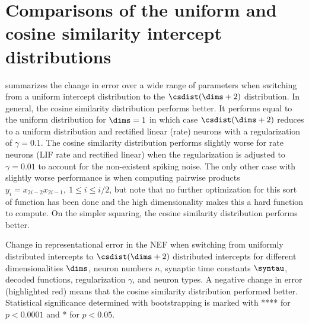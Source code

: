 \chapter{Comparisons of the uniform and cosine similarity intercept distributions}\label{apdx:hdrep}
 summarizes the change in error over a wide range of parameters when switching from a uniform intercept distribution to the $\csdist(\dims + 2)$ distribution.
In general, the cosine similarity distribution performs better.
It performs equal to the uniform distribution for $\dims = 1$ in which case $\csdist(\dims + 2)$ reduces to a uniform distribution and rectified linear (rate) neurons with a regularization of $\gamma = 0.1$.
The cosine similarity distribution performs slightly worse for rate neurons (LIF rate and rectified linear) when the regularization is adjusted to $\gamma = 0.01$ to account for the non-existent spiking noise.
The only other case with slightly worse performance is when computing pairwise products $y_i = x_{2i - 2} x_{2i - 1},\ 1 \leq i \leq i/2$, but note that no further optimization for this sort of function has been done and the high dimensionality makes this a hard function to compute.
On the simpler squaring, the cosine similarity distribution performs better.
\begin{table}
    \caption{Change in representational error in the NEF when switching from uniformly distributed intercepts to $\csdist(\dims + 2)$ distributed intercepts for different dimensionalities $\dims$, neuron numbers $n$, synaptic time constants $\syntau$, decoded functions, regularization $\gamma$, and neuron types.
A negative change in error (highlighted red) means that the cosine similarity distribution performed better.
Statistical significance determined with bootstrapping is marked with **** for $p < 0.0001$ and * for $p < 0.05$.}\label{tbl:csdist}
    \scriptsize
    
\end{table}
